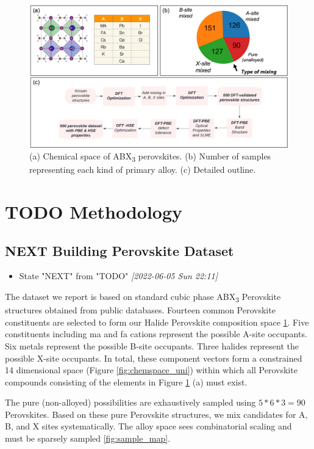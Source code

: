 \documentclass[twoside, twocolumn, 9pt, draft]{article}
\begin{document}
\begin{figure}
\centering
\includegraphics[h,width=.9\linewidth]{outline.png}
\caption{\label{fig:outline} (a) Chemical space of ABX\textsubscript{3} perovskites. (b) Number of samples representing each kind of primary alloy. (c) Detailed outline.}
\end{figure}

\section*{{\bfseries\sffamily TODO} Methodology}
\label{sec:org4b02d79}
\subsection*{{\bfseries\sffamily NEXT} Building Perovskite Dataset}
\label{sec:org649f3a0}
\begin{itemize}
\item State "NEXT"       from "TODO"       \textit{[2022-06-05 Sun 22:11]}
\end{itemize}
The dataset we report is based on standard cubic phase ABX\textsubscript{3}
Perovskite structures obtained from public databases. Fourteen common
Perovskite constituents are selected to form our Halide Perovskite
composition space \ref{fig:outline}. Five constituents including
\acrfull{ma} and \acrfull{fa}
cations represent the possible A-site occupants. Six metals
represent the possible B-site occupants. Three halides represent the
possible X-site occupants. In total, these component vectors form a
constrained 14 dimensional space (Figure \ref{fig:chemspace_uni}) within
which all Perovskite compounds consisting of the elements in Figure
\ref{fig:outline} (a) must exist.

The pure (non-alloyed) possibilities are exhaustively sampled using
\(5*6*3 = 90\) Perovskites. Based on these pure Perovskite structures,
we mix candidates for A, B, and X sites systematically. The alloy
space sees combinatorial scaling and must be sparsely sampled
\ref{fig:sample_map}.
\end{document}
